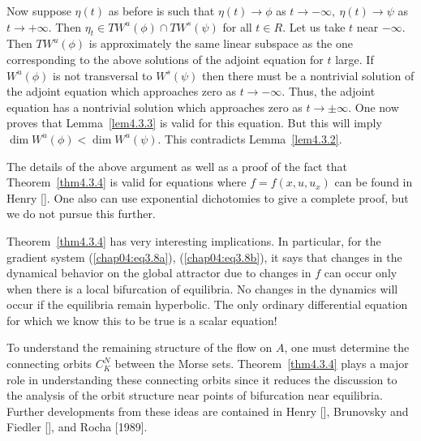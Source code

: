 \documentclass{surv-l}
\theoremstyle{plain}
\theoremstyle{definition}
\numberwithin{equation}{section}
\numberwithin{figure}{chapter}
\begin{document}
Now suppose $\eta(t)$ as before is such that $\eta(t)\rightarrow\phi$ as $ t\rightarrow-\infty,\ \eta(t)\rightarrow\psi$ as $ t\rightarrow+\infty$. Then $\eta_{t}\in TW^{u}(\phi)\cap TW^{s}(\psi)$ for all $t\in R$. Let us take $t$ near $-\infty$. Then $TW^{u}(\phi)$ is approximately the same linear subspace as the one corresponding to the above solutions of the adjoint equation for $t$ large. If $W^{u}(\phi)$ is not transversal to $W^{s}(\psi)$ then there must be a nontrivial solution of the adjoint equation which approaches zero as $ t\rightarrow-\infty$. Thus, the adjoint equation has a nontrivial solution which approaches zero as $ t\rightarrow\pm\infty$. One now proves that Lemma~\ref{lem4.3.3} is valid for this equation. But this will imply $\dim W^{u}(\phi)<\dim W^{u}(\psi)$. This contradicts Lemma~\ref{lem4.3.2}.

The details of the above argument as well as a proof of the fact that Theorem~\ref{thm4.3.4} is valid for equations where $f=f(x, u, u_{x})$ can be found in Henry [\citeyear{1985henry}]. One also can use exponential dichotomies to give a complete proof, but we do not pursue this further.

Theorem~\ref{thm4.3.4} has very interesting implications. In particular, for the gradient system (\ref{chap04:eq3.8a}), (\ref{chap04:eq3.8b}), it says that changes in the dynamical behavior on the global attractor due to changes in $f$ can occur only when there is a local bifurcation of equilibria. No changes in the dynamics will occur if the equilibria remain hyperbolic. The only ordinary differential equation for which we know this to be true is a scalar equation!

To understand the remaining structure of the flow on $A$, one must determine the connecting orbits $C_{K}^{N}$ between the Morse sets. Theorem~\ref{thm4.3.4} plays a major role in understanding these connecting orbits since it reduces the discussion to the analysis of the orbit structure near points of bifurcation near equilibria. Further developments from these ideas are contained in Henry [\citeyear{1985henry}], Brunovsky and Fiedler [\citeyear{1989bf}], and Rocha [1989].
\end{document}
